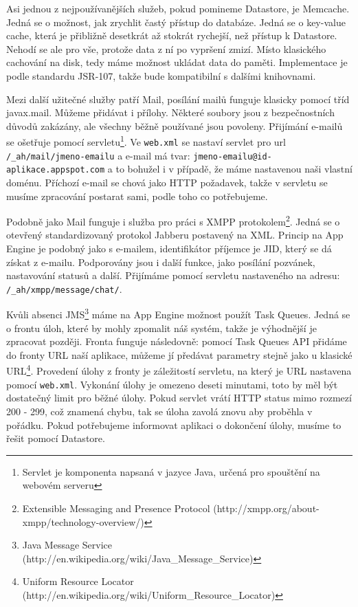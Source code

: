 Asi jednou z nejpoužívanějších služeb, pokud pomineme Datastore, je Memcache. Jedná se o možnost, jak zrychlit častý přístup do databáze. Jedná se o key-value cache, která je přibližně desetkrát až stokrát rychejší, než přístup k Datastore. Nehodí se ale pro vše, protože data z ní po vypršení zmizí. Místo klasického cachování na disk, tedy máme možnost ukládat data do paměti. Implementace je podle standardu JSR-107, takže bude kompatibilní s dalšími knihovnami.

Mezi další užitečné služby patří Mail, posílání mailů funguje klasicky pomocí tříd javax.mail. Můžeme přidávat i přílohy. Některé soubory jsou z bezpečnostních důvodů zakázány, ale všechny běžně používané jsou povoleny. Přijímání e-mailů se ošetřuje pomocí servletu\footnote{Servlet je komponenta napsaná v jazyce Java, určená pro spouštění na webovém serveru}. Ve \verb|web.xml| se nastaví servlet pro url \verb|/_ah/mail/jmeno-emailu| a e-mail má tvar: \verb|jmeno-emailu@id-aplikace.appspot.com| a to bohužel i v případě, že máme nastavenou naši vlastní doménu. Příchozí e-mail se chová jako HTTP požadavek, takže v servletu se musíme zpracování postarat sami, podle toho co potřebujeme. 

Podobně jako Mail funguje i služba pro práci s XMPP protokolem\footnote{Extensible Messaging and Presence Protocol (http://xmpp.org/about-xmpp/technology-overview/)}. Jedná se o otevřený standardizovaný protokol Jabberu postavený na XML. Princip na App Engine je podobný jako s e-mailem, identifikátor příjemce je JID, který se dá získat  z e-mailu. Podporovány jsou i další funkce, jako posílání pozvánek, nastavování statusů a další. Přijímáme pomocí servletu nastaveného na adresu: \verb|/_ah/xmpp/message/chat/|.

Kvůli absenci JMS\footnote{Java Message Service (http://en.wikipedia.org/wiki/Java\_Message\_Service)} máme na App Engine možnost použít Task Queues. Jedná se o frontu úloh, které by mohly zpomalit náš systém, takže je výhodnější je zpracovat později. Fronta funguje následovně: pomocí Task Queues API přidáme do fronty URL naší aplikace, můžeme jí předávat parametry stejně jako u klasické URL\footnote{Uniform Resource Locator (http://en.wikipedia.org/wiki/Uniform\_Resource\_Locator)}. Provedení úlohy z fronty je záležitostí servletu, na který je URL nastavena pomocí \verb|web.xml|. Vykonání úlohy je omezeno deseti minutami, toto by měl být dostatečný limit pro běžné úlohy. Pokud servlet vrátí HTTP status mimo rozmezí 200 - 299, což znamená chybu, tak se úloha zavolá znovu aby proběhla v pořádku. Pokud potřebujeme informovat aplikaci o dokončení úlohy, musíme to řešit pomocí Datastore.

